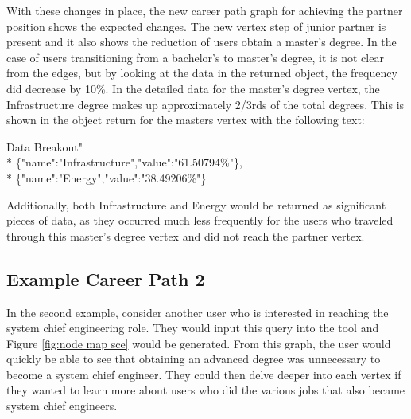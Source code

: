 With these changes in place, the new career path graph for achieving the partner
position shows the expected changes.  The new vertex step of junior partner is
present and it also shows the reduction of users obtain a master's degree.  In
the case of users transitioning from a bachelor's to master's degree, it is not
clear from the edges, but by looking at the data in the returned object, the
frequency did decrease by 10\%.  In the detailed data for the master's degree
vertex, the Infrastructure degree makes up approximately 2/3rds of the total
degrees.  This is shown in the object return for the masters vertex with the
following text:

\begin{tt}
\begin{footnotesize}
\indent Data Breakout"\\*
\indent \indent \indent \{"name":"Infrastructure","value":"61.50794\%"\},\\*
\indent \indent \indent \{"name":"Energy","value":"38.49206\%"\}
\end{footnotesize}
\end{tt}

\noindent Additionally, both Infrastructure and Energy would be returned as
significant pieces of data, as they occurred much less frequently for the users
who traveled through this master's degree vertex and did not reach the partner
vertex.

\subsection{Example Career Path 2 }
In the second example, consider another user who is interested in reaching the
system chief engineering role.  They would input this query into the tool and
Figure \ref{fig:node map sce} would be generated.  From this graph, the user
would quickly be able to see that obtaining an advanced degree was unnecessary
to become a system chief engineer.  They could then delve deeper into each vertex
if they wanted to learn more about users who did the various jobs that also
became system chief engineers.


\usetikzlibrary{shapes,arrows,chains}

